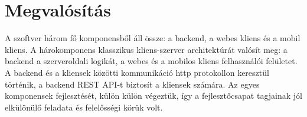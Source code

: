 \section{Megvalósítás}
\label{sec:implementation}


A szoftver három fő komponensből áll össze: a backend, a webes kliens és a mobil kliens.
A hárokomponens klasszikus kliens-szerver architektúrát valósít meg: a backend a szerveroldali logikát, a webes és a mobilos kliens 
felhasználói felületet.
A backend és a kliensek közötti kommunikáció http protokollon keresztül történik, a backend REST API-t biztosít a kliensek számára.
Az egyes komponensek fejlesztését, külön külön végeztük, így a fejlesztőcsapat tagjainak jól elkülönülő feladata és felelősségi körük volt.